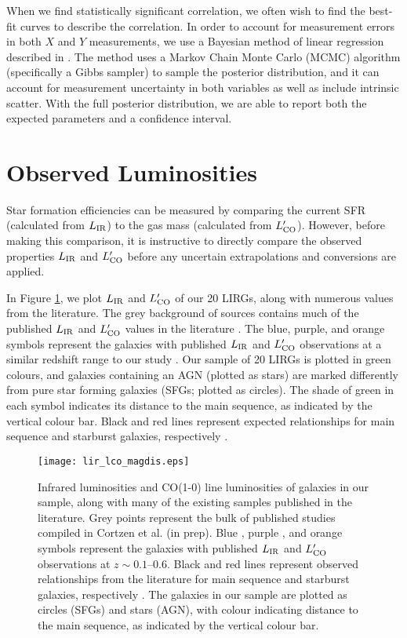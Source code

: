 \documentclass[a4paper,fleqn,usenatbib]{mnras}
\newcommand{\lir}{L_{\rm{IR}}}
\newcommand{\lco}{L'_{\rm{CO}}}
\begin{document}
When we find statistically significant correlation, we often wish to find the best-fit curves to describe the correlation. In order to account for measurement errors in both $X$ and $Y$ measurements, we use a Bayesian method of linear regression described in \citet{2007ApJ...665.1489K}.  The \citet{2007ApJ...665.1489K} method uses a Markov Chain Monte Carlo (MCMC) algorithm (specifically a Gibbs sampler) to sample the posterior distribution, and it can account for measurement uncertainty in both variables as well as include intrinsic scatter. With the full posterior distribution, we are able to report both the expected parameters and a confidence interval. 

\section{Observed Luminosities}\label{sec:lir_lco}


Star formation efficiencies can be measured by comparing the current SFR (calculated from $\lir$) to the gas mass (calculated from $\lco$). However, before making this comparison, it is instructive to directly compare the observed properties $\lir$ and $\lco$ before any uncertain extrapolations and conversions are applied. 

In Figure \ref{fig:lir_lco}, we plot $\lir$ and $\lco$ of our 20 LIRGs, along with numerous values from the literature. The grey background of sources contains much of the published $\lir$ and $\lco$ values in the literature \citep[][and references within]{Cortzen_Thesis}. 
The blue, purple, and orange symbols represent the galaxies with published $\lir$ and $\lco$ observations at a similar redshift range to our study \citep[$z \sim 0.1$--0.6;][]{2011A&A...528A.124C,2013ApJ...768..132B,2014ApJ...796...63M}. Our sample of 20 LIRGs is plotted in green colours, and galaxies containing an AGN (plotted as stars) are marked differently from pure star forming galaxies (SFGs; plotted as circles).  The shade of green in each symbol indicates its distance to the main sequence, as indicated by the vertical colour bar.  Black and red lines represent expected relationships for main sequence and starburst galaxies, respectively \citep{2014ApJ...793...19S}. %

\begin{figure*}
\centering
\texttt{[image: lir\_lco\_magdis.eps]}
\caption{Infrared luminosities and CO(1-0) line luminosities of galaxies in our sample, along with many of the existing samples published in the literature. Grey points represent the bulk of published studies compiled in Cortzen et al. (in prep). Blue \citep{2011A&A...528A.124C}, purple \citep{2013ApJ...768..132B}, and orange \citep{2014ApJ...796...63M} symbols represent the galaxies with published $\lir$ and $\lco$ observations at $z \sim 0.1$--0.6. Black and red lines represent observed relationships from the literature for main sequence and starburst galaxies, respectively \citep{2014ApJ...793...19S}.  The galaxies in our sample are plotted as circles (SFGs) and stars (AGN), with colour indicating distance to the main sequence, as indicated by the vertical colour bar. }
\label{fig:lir_lco}
\end{figure*}
\end{document}
